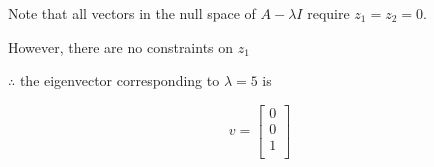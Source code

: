 \documentclass[fleqn]{article}
\begin{document}
\begin{enumerate}[nolistsep]
		Note that all vectors in the null space of $A - {\lambda}I$ require $z_1 = z_2 = 0$.
		
		However, there are no constraints on $z_1$
		
		$\therefore$ the eigenvector corresponding to $\lambda = 5$ is
		
		\begin{equation*}
			v = \begin{bmatrix}
				0 \\
				0 \\
				1 \\
			\end{bmatrix}
		\end{equation*}
		
	\end{enumerate}
\end{document}
